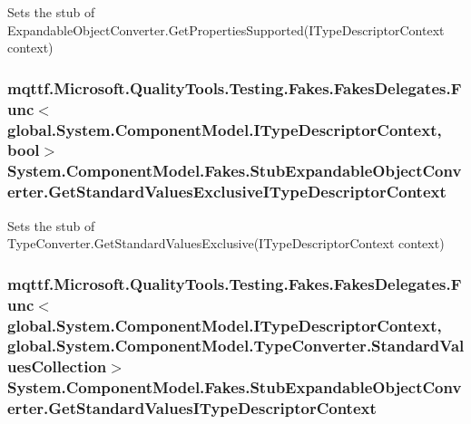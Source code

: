 Sets the stub of Expandable\-Object\-Converter.\-Get\-Properties\-Supported(\-I\-Type\-Descriptor\-Context context)

\hypertarget{class_system_1_1_component_model_1_1_fakes_1_1_stub_expandable_object_converter_ae8aaade60f7094ffe3317c8e512aa6f3}{
\subsubsection[{Get\-Standard\-Values\-Exclusive\-I\-Type\-Descriptor\-Context}]{\setlength{\rightskip}{0pt plus 5cm}mqttf.\-Microsoft.\-Quality\-Tools.\-Testing.\-Fakes.\-Fakes\-Delegates.\-Func$<$global.\-System.\-Component\-Model.\-I\-Type\-Descriptor\-Context, bool$>$ System.\-Component\-Model.\-Fakes.\-Stub\-Expandable\-Object\-Converter.\-Get\-Standard\-Values\-Exclusive\-I\-Type\-Descriptor\-Context}}\label{class_system_1_1_component_model_1_1_fakes_1_1_stub_expandable_object_converter_ae8aaade60f7094ffe3317c8e512aa6f3}


Sets the stub of Type\-Converter.\-Get\-Standard\-Values\-Exclusive(\-I\-Type\-Descriptor\-Context context)

\hypertarget{class_system_1_1_component_model_1_1_fakes_1_1_stub_expandable_object_converter_a066ab97473767d4ea105b9d249e99191}{
\subsubsection[{Get\-Standard\-Values\-I\-Type\-Descriptor\-Context}]{\setlength{\rightskip}{0pt plus 5cm}mqttf.\-Microsoft.\-Quality\-Tools.\-Testing.\-Fakes.\-Fakes\-Delegates.\-Func$<$global.\-System.\-Component\-Model.\-I\-Type\-Descriptor\-Context, global.\-System.\-Component\-Model.\-Type\-Converter.\-Standard\-Values\-Collection$>$ System.\-Component\-Model.\-Fakes.\-Stub\-Expandable\-Object\-Converter.\-Get\-Standard\-Values\-I\-Type\-Descriptor\-Context}}\label{class_system_1_1_component_model_1_1_fakes_1_1_stub_expandable_object_converter_a066ab97473767d4ea105b9d249e99191}


